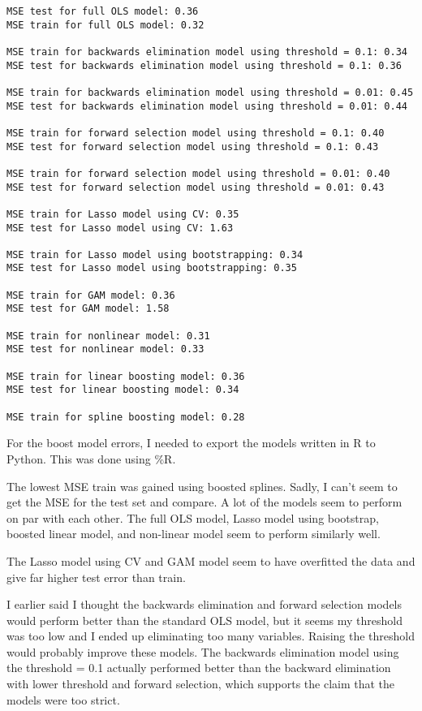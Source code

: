 \documentclass[11pt]{article}
\begin{document}
    \begin{Verbatim}[commandchars=\\\{\}]
MSE test for full OLS model: 0.36
MSE train for full OLS model: 0.32

MSE train for backwards elimination model using threshold = 0.1: 0.34
MSE test for backwards elimination model using threshold = 0.1: 0.36

MSE train for backwards elimination model using threshold = 0.01: 0.45
MSE test for backwards elimination model using threshold = 0.01: 0.44

MSE train for forward selection model using threshold = 0.1: 0.40
MSE test for forward selection model using threshold = 0.1: 0.43

MSE train for forward selection model using threshold = 0.01: 0.40
MSE test for forward selection model using threshold = 0.01: 0.43

MSE train for Lasso model using CV: 0.35
MSE test for Lasso model using CV: 1.63

MSE train for Lasso model using bootstrapping: 0.34
MSE test for Lasso model using bootstrapping: 0.35

MSE train for GAM model: 0.36
MSE test for GAM model: 1.58

MSE train for nonlinear model: 0.31
MSE test for nonlinear model: 0.33

MSE train for linear boosting model: 0.36
MSE test for linear boosting model: 0.34

MSE train for spline boosting model: 0.28
    \end{Verbatim}

    For the boost model errors, I needed to export the models written in R
to Python. This was done using \%R.

The lowest MSE train was gained using boosted splines. Sadly, I can't
seem to get the MSE for the test set and compare. A lot of the models
seem to perform on par with each other. The full OLS model, Lasso model
using bootstrap, boosted linear model, and non-linear model seem to
perform similarly well.

The Lasso model using CV and GAM model seem to have overfitted the data
and give far higher test error than train.

I earlier said I thought the backwards elimination and forward selection
models would perform better than the standard OLS model, but it seems my
threshold was too low and I ended up eliminating too many variables.
Raising the threshold would probably improve these models. The backwards
elimination model using the threshold = 0.1 actually performed better
than the backward elimination with lower threshold and forward
selection, which supports the claim that the models were too strict.
\end{document}
